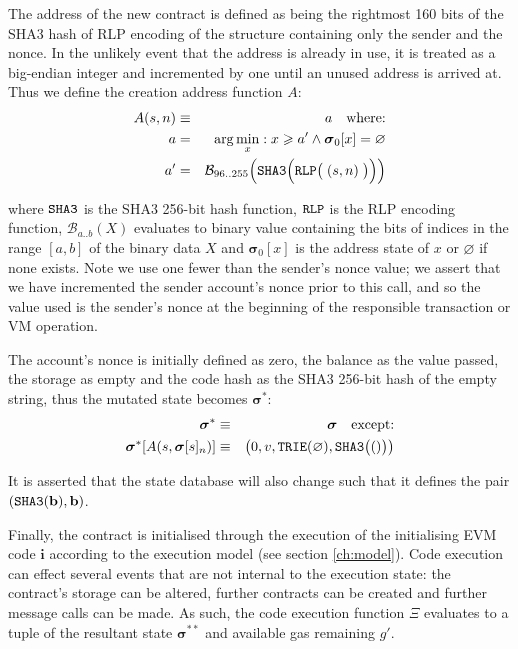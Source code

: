 \documentclass[9pt,oneside]{amsart}
\begin{document}
\begin{multicols}{2}
The address of the new contract is defined as being the rightmost 160 bits of the SHA3 hash of RLP encoding of the structure containing only the sender and the nonce. In the unlikely event that the address is already in use, it is treated as a big-endian integer and incremented by one until an unused address is arrived at. Thus we define the creation address function $A$:
\begin{eqnarray}
A(s, n) & \equiv & a \quad \text{where:} \\
a & = & \arg \min_x : x \geqslant a' \wedge \boldsymbol{\sigma}_0[x] = \varnothing \\
a' & = & \mathcal{B}_{96..255}\Big(\mathtt{\tiny SHA3}\Big(\mathtt{\tiny RLP}\big(\;(s, n)\;\big)\Big)\Big)
\end{eqnarray}

where $\mathtt{\tiny SHA3}$ is the SHA3 256-bit hash function, $\mathtt{\tiny RLP}$ is the RLP encoding function, $\mathcal{B}_{a..b}(X)$ evaluates to binary value containing the bits of indices in the range $[a, b]$ of the binary data $X$ and $\boldsymbol{\sigma}_0[x]$ is the address state of $x$ or $\varnothing$ if none exists. Note we use one fewer than the sender's nonce value; we assert that we have incremented the sender account's nonce prior to this call, and so the value used is the sender's nonce at the beginning of the responsible transaction or VM operation.

The account's nonce is initially defined as zero, the balance as the value passed, the storage as empty and the code hash as the SHA3 256-bit hash of the empty string, thus the mutated state becomes $\boldsymbol{\sigma}^*$:
\begin{eqnarray}
\boldsymbol{\sigma}^* & \equiv & \boldsymbol{\sigma} \quad \text{except:} \\
\boldsymbol{\sigma}^*[A(s, \boldsymbol{\sigma}[s]_n)] & \equiv & \big( 0, v, \mathtt{\tiny TRIE}(\varnothing), \mathtt{\tiny SHA3}\big(()\big) \big)
\end{eqnarray}

It is asserted that the state database will also change such that it defines the pair $(\mathtt{\tiny SHA3}(\mathbf{b}), \mathbf{b})$.

Finally, the contract is initialised through the execution of the initialising EVM code $\mathbf{i}$ according to the execution model (see section \ref{ch:model}). Code execution can effect several events that are not internal to the execution state: the contract's storage can be altered, further contracts can be created and further message calls can be made. As such, the code execution function $\Xi$ evaluates to a tuple of the resultant state $\boldsymbol{\sigma}^{**}$ and available gas remaining $g'$.


\end{multicols}
\end{document}
